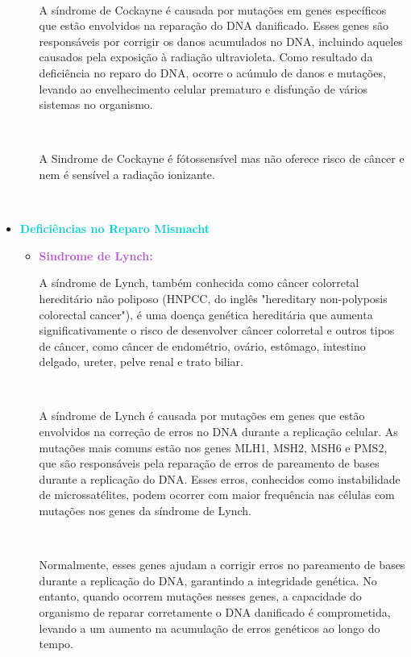 \documentclass[11pt,a4paper]{article}
\begin{document}
\begin{itemize}[label=\textcolor{CarnationPink}{$\blacktriangleright$}]
\begin{itemize}[label=\textcolor{CarnationPink}{$\star$}]
			\

			A síndrome de Cockayne é causada por mutações em genes específicos que estão envolvidos na reparação do DNA danificado. Esses genes são responsáveis por corrigir os danos acumulados no DNA, incluindo aqueles causados pela exposição à radiação ultravioleta. Como resultado da deficiência no reparo do DNA, ocorre o acúmulo de danos e mutações, levando ao envelhecimento celular prematuro e disfunção de vários sistemas no organismo.
			
			\

			A Sindrome de Cockayne é fótossensível mas não oferece risco de câncer e nem é sensível a radiação ionizante.
		\end{itemize}
		
		\

		\item \textcolor{DarkTurquoise}{\LobsterTwo\Large\textbf{Deficiências no Reparo Mismacht}}
		\begin{itemize}[label=\textcolor{CarnationPink}{$\star$}]
			\item \textcolor{MediumOrchid}{\large\textbf{Sindrome de Lynch:}} 
			
			A síndrome de Lynch, também conhecida como câncer colorretal hereditário não poliposo (HNPCC, do inglês "hereditary non-polyposis colorectal cancer"), é uma doença genética hereditária que aumenta significativamente o risco de desenvolver câncer colorretal e outros tipos de câncer, como câncer de endométrio, ovário, estômago, intestino delgado, ureter, pelve renal e trato biliar.
			
			\

			A síndrome de Lynch é causada por mutações em genes que estão envolvidos na correção de erros no DNA durante a replicação celular. As mutações mais comuns estão nos genes MLH1, MSH2, MSH6 e PMS2, que são responsáveis pela reparação de erros de pareamento de bases durante a replicação do DNA. Esses erros, conhecidos como instabilidade de microssatélites, podem ocorrer com maior frequência nas células com mutações nos genes da síndrome de Lynch.

			\

			Normalmente, esses genes ajudam a corrigir erros no pareamento de bases durante a replicação do DNA, garantindo a integridade genética. No entanto, quando ocorrem mutações nesses genes, a capacidade do organismo de reparar corretamente o DNA danificado é comprometida, levando a um aumento na acumulação de erros genéticos ao longo do tempo.


\end{itemize}
\end{itemize}
\end{document}
